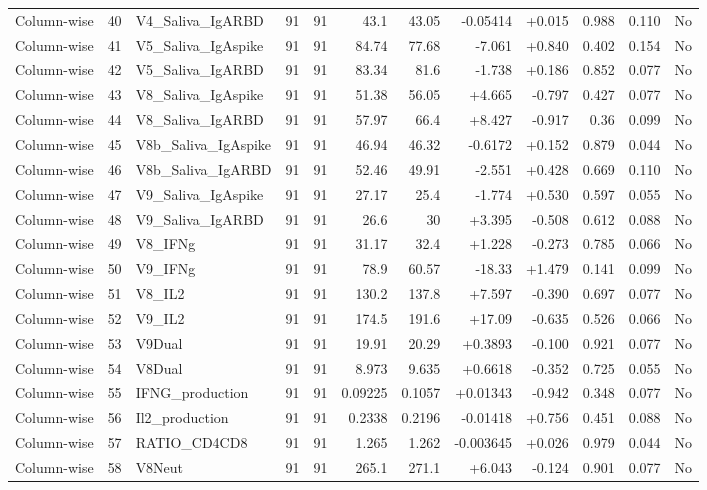 \begin{landscape}
\begin{longtable}{@{}lrp{4.0cm}rrrrrrrrr@{}}
Column-wise & 40 & V4\_Saliva\_IgARBD & 91 & 91 & 43.1 & 43.05 & -0.05414 & +0.015 & 0.988 & 0.110 & No \\
Column-wise & 41 & V5\_Saliva\_IgAspike & 91 & 91 & 84.74 & 77.68 & -7.061 & +0.840 & 0.402 & 0.154 & No \\
Column-wise & 42 & V5\_Saliva\_IgARBD & 91 & 91 & 83.34 & 81.6 & -1.738 & +0.186 & 0.852 & 0.077 & No \\
Column-wise & 43 & V8\_Saliva\_IgAspike & 91 & 91 & 51.38 & 56.05 & +4.665 & -0.797 & 0.427 & 0.077 & No \\
Column-wise & 44 & V8\_Saliva\_IgARBD & 91 & 91 & 57.97 & 66.4 & +8.427 & -0.917 & 0.36 & 0.099 & No \\
Column-wise & 45 & V8b\_Saliva\_IgAspike & 91 & 91 & 46.94 & 46.32 & -0.6172 & +0.152 & 0.879 & 0.044 & No \\
Column-wise & 46 & V8b\_Saliva\_IgARBD & 91 & 91 & 52.46 & 49.91 & -2.551 & +0.428 & 0.669 & 0.110 & No \\
Column-wise & 47 & V9\_Saliva\_IgAspike & 91 & 91 & 27.17 & 25.4 & -1.774 & +0.530 & 0.597 & 0.055 & No \\
Column-wise & 48 & V9\_Saliva\_IgARBD & 91 & 91 & 26.6 & 30 & +3.395 & -0.508 & 0.612 & 0.088 & No \\
Column-wise & 49 & V8\_IFNg & 91 & 91 & 31.17 & 32.4 & +1.228 & -0.273 & 0.785 & 0.066 & No \\
Column-wise & 50 & V9\_IFNg & 91 & 91 & 78.9 & 60.57 & -18.33 & +1.479 & 0.141 & 0.099 & No \\
Column-wise & 51 & V8\_IL2 & 91 & 91 & 130.2 & 137.8 & +7.597 & -0.390 & 0.697 & 0.077 & No \\
Column-wise & 52 & V9\_IL2 & 91 & 91 & 174.5 & 191.6 & +17.09 & -0.635 & 0.526 & 0.066 & No \\
Column-wise & 53 & V9Dual & 91 & 91 & 19.91 & 20.29 & +0.3893 & -0.100 & 0.921 & 0.077 & No \\
Column-wise & 54 & V8Dual & 91 & 91 & 8.973 & 9.635 & +0.6618 & -0.352 & 0.725 & 0.055 & No \\
Column-wise & 55 & IFNG\_production & 91 & 91 & 0.09225 & 0.1057 & +0.01343 & -0.942 & 0.348 & 0.077 & No \\
Column-wise & 56 & Il2\_production & 91 & 91 & 0.2338 & 0.2196 & -0.01418 & +0.756 & 0.451 & 0.088 & No \\
Column-wise & 57 & RATIO\_CD4CD8 & 91 & 91 & 1.265 & 1.262 & -0.003645 & +0.026 & 0.979 & 0.044 & No \\
Column-wise & 58 & V8Neut & 91 & 91 & 265.1 & 271.1 & +6.043 & -0.124 & 0.901 & 0.077 & No \\

\end{longtable}
\end{landscape}
